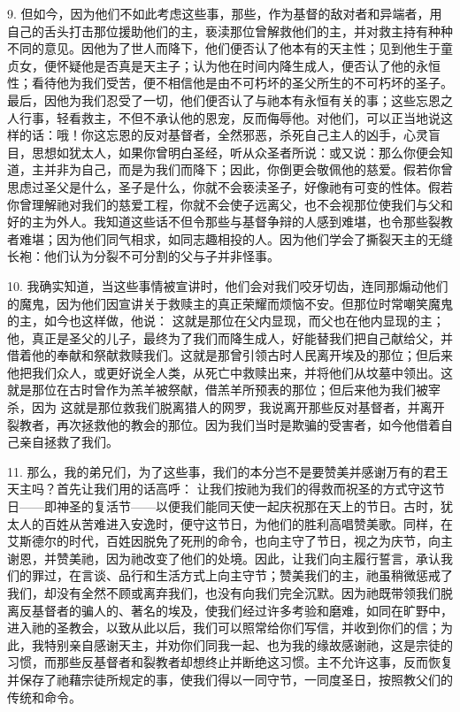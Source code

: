 9. 但如今，因为他们不如此考虑这些事，那些，作为基督的敌对者和异端者，用自己的舌头打击那位援助他们的主，亵渎那位曾解救他们的主，并对救主持有种种不同的意见。因他为了世人而降下，他们便否认了他本有的天主性；见到他生于童贞女，便怀疑他是否真是天主子；认为他在时间内降生成人，便否认了他的永恒性；看待他为我们受苦，便不相信他是由不可朽坏的圣父所生的不可朽坏的圣子。最后，因他为我们忍受了一切，他们便否认了与祂本有永恒有关的事；这些忘恩之人行事，轻看救主，不但不承认他的恩宠，反而侮辱他。对他们，可以正当地说这样的话：哦！你这忘恩的反对基督者，全然邪恶，杀死自己主人的凶手，心灵盲目，思想如犹太人，如果你曾明白圣经，听从众圣者所说：或又说：那么你便会知道，主并非为自己，而是为我们而降下；因此，你倒更会敬佩他的慈爱。假若你曾思虑过圣父是什么，圣子是什么，你就不会亵渎圣子，好像祂有可变的性体。假若你曾理解祂对我们的慈爱工程，你就不会使子远离父，也不会视那位使我们与父和好的主为外人。我知道这些话不但令那些与基督争辩的人感到难堪，也令那些裂教者难堪；因为他们同气相求，如同志趣相投的人。因为他们学会了撕裂天主的无缝长袍：他们认为分裂不可分割的父与子并非怪事。\par

10. 我确实知道，当这些事情被宣讲时，他们会对我们咬牙切齿，连同那煽动他们的魔鬼，因为他们因宣讲关于救赎主的真正荣耀而烦恼不安。但那位时常嘲笑魔鬼的主，如今也这样做，他说： 这就是那位在父内显现，而父也在他内显现的主；他，真正是圣父的儿子，最终为了我们而降生成人，好能替我们把自己献给父，并借着他的奉献和祭献救赎我们。这就是那曾引领古时人民离开埃及的那位；但后来他把我们众人，或更好说全人类，从死亡中救赎出来，并将他们从坟墓中领出。这就是那位在古时曾作为羔羊被祭献，借羔羊所预表的那位；但后来他为我们被宰杀，因为 这就是那位救我们脱离猎人的网罗，我说离开那些反对基督者，并离开裂教者，再次拯救他的教会的那位。因为我们当时是欺骗的受害者，如今他借着自己亲自拯救了我们。\par

11. 那么，我的弟兄们，为了这些事，我们的本分岂不是要赞美并感谢万有的君王天主吗？首先让我们用的话高呼：  让我们按祂为我们的得救而祝圣的方式守这节日——即神圣的复活节——以便我们能同天使一起庆祝那在天上的节日。古时，犹太人的百姓从苦难进入安逸时，便守这节日，为他们的胜利高唱赞美歌。同样，在艾斯德尔的时代，百姓因脱免了死刑的命令，也向主守了节日，视之为庆节，向主谢恩，并赞美祂，因为祂改变了他们的处境。因此，让我们向主履行誓言，承认我们的罪过，在言谈、品行和生活方式上向主守节；赞美我们的主，祂虽稍微惩戒了我们，却没有全然不顾或离弃我们，也没有向我们完全沉默。因为祂既带领我们脱离反基督者的骗人的、著名的埃及，使我们经过许多考验和磨难，如同在旷野中，进入祂的圣教会，以致从此以后，我们可以照常给你们写信，并收到你们的信；为此，我特别亲自感谢天主，并劝你们同我一起、也为我的缘故感谢祂，这是宗徒的习惯，而那些反基督者和裂教者却想终止并断绝这习惯。主不允许这事，反而恢复并保存了祂藉宗徒所规定的事，使我们得以一同守节，一同度圣日，按照教父们的传统和命令。\par

